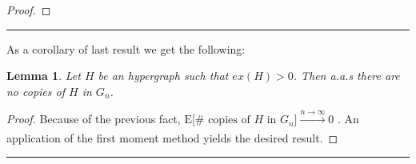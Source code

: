 \documentclass[12pt,notitlepage,a4paper]{article}
\newtheorem{lemma}{Lemma}[section]
\theoremstyle{definition}
\newcommand{\N}{\mathbb{N}}
\newcommand{\Ln}{\lim\limits_{n\to \infty}}
\newcommand{\sep}{\noindent\rule{2cm}{0.4pt}}
\newcommand{\aut}{\mathrm{aut}}
\begin{document}
\begin{proof}
\end{proof}
\sep

As a corollary of last result we get the following:  
\begin{lemma} \label{lem:nocopiesdense}
	Let $H$ be an hypergraph such that $ex(H)>0$. Then
	a.a.s there are no copies of $H$ in $G_n$. 
\end{lemma}  
\begin{proof}
	Because of the previous fact, 
	$\mathrm{E}\big[\# \text{ copies of }H \text{ in } G_n\big] 
	\xrightarrow[]{n\to \infty} 0$ . An application of the first moment
	method yields the desired result. 
\end{proof} 
\sep
\end{document}
